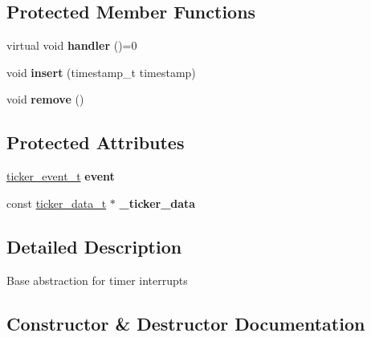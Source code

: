 \subsection*{Protected Member Functions}
\begin{DoxyCompactItemize}
\item 
virtual void {\bfseries handler} ()=0\hypertarget{classmbed_1_1TimerEvent_ae3e8dbec184090a2d8f9378773bcbc85}{}\label{classmbed_1_1TimerEvent_ae3e8dbec184090a2d8f9378773bcbc85}

\item 
void {\bfseries insert} (timestamp\+\_\+t timestamp)\hypertarget{classmbed_1_1TimerEvent_a563aecee58f1db32bb70199952fd81d7}{}\label{classmbed_1_1TimerEvent_a563aecee58f1db32bb70199952fd81d7}

\item 
void {\bfseries remove} ()\hypertarget{classmbed_1_1TimerEvent_ac8dddb3d9affcc3267e910fb305d956f}{}\label{classmbed_1_1TimerEvent_ac8dddb3d9affcc3267e910fb305d956f}

\end{DoxyCompactItemize}
\subsection*{Protected Attributes}
\begin{DoxyCompactItemize}
\item 
\hyperlink{structticker__event__s}{ticker\+\_\+event\+\_\+t} {\bfseries event}\hypertarget{classmbed_1_1TimerEvent_a80ea97a2c88250aa898f4adda12a9228}{}\label{classmbed_1_1TimerEvent_a80ea97a2c88250aa898f4adda12a9228}

\item 
const \hyperlink{structticker__data__t}{ticker\+\_\+data\+\_\+t} $\ast$ {\bfseries \+\_\+ticker\+\_\+data}\hypertarget{classmbed_1_1TimerEvent_acc2c35b1cf2900aa08357b1a2a64db02}{}\label{classmbed_1_1TimerEvent_acc2c35b1cf2900aa08357b1a2a64db02}

\end{DoxyCompactItemize}


\subsection{Detailed Description}
Base abstraction for timer interrupts 

\subsection{Constructor \& Destructor Documentation}
